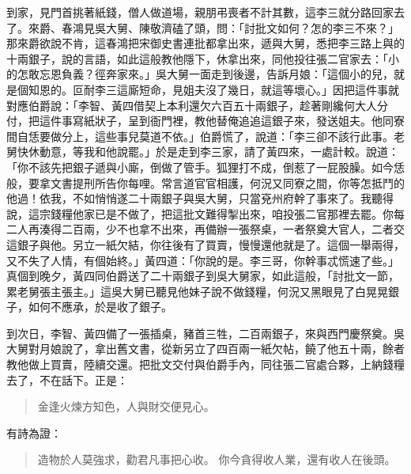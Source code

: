 到家，見門首挑著紙錢，僧人做道場，親朋弔喪者不計其數，這李三就分路回家去了。來爵、春鴻見吳大舅、陳敬濟磕了頭，問：「討批文如何？怎的李三不來？」那來爵欲說不肯，這春鴻把宋御史書連批都拿出來，遞與大舅，悉把李三路上與的十兩銀子，說的言語，如此這般教他隱下，休拿出來，同他投往張二官家去：「小的怎敢忘恩負義？徑奔家來。」吳大舅一面走到後邊，告訴月娘：「這個小的兒，就是個知恩的。叵耐李三這廝短命，見姐夫沒了幾日，就這等壞心。」因把這件事就對應伯爵說：「李智、黃四借契上本利還欠六百五十兩銀子，趁著剛纔何大人分付，把這件事寫紙狀子，呈到衙門裡，教他替俺追追這銀子來，發送姐夫。他同寮間自恁要做分上，這些事兒莫道不依。」伯爵慌了，說道：「李三卻不該行此事。老舅快休動意，等我和他說罷。」於是走到李三家，請了黃四來，一處計較。說道：「你不該先把銀子遞與小廝，倒做了管手。狐狸打不成，倒惹了一屁股臊。如今恁般，要拿文書提刑所告你每哩。常言道官官相護，何況又同寮之間，你等怎抵鬥的他過！依我，不如悄悄遂二十兩銀子與吳大舅，只當兗州府幹了事來了。我聽得說，這宗錢糧他家已是不做了，把這批文難得掣出來，咱投張二官那裡去罷。你每二人再湊得二百兩，少不也拿不出來，再備辦一張祭桌，一者祭奠大官人，二者交這銀子與他。另立一紙欠結，你往後有了買賣，慢慢還他就是了。這個一舉兩得，又不失了人情，有個始終。」黃四道：「你說的是。李三哥，你幹事忒慌速了些。」真個到晚夕，黃四同伯爵送了二十兩銀子到吳大舅家，如此這般，「討批文一節，累老舅張主張主。」這吳大舅已聽見他妹子說不做錢糧，何況又黑眼見了白晃晃銀子，如何不應承，於是收了銀子。

到次日，李智、黃四備了一張插桌，豬首三牲，二百兩銀子，來與西門慶祭奠。吳大舅對月娘說了，拿出舊文書，從新另立了四百兩一紙欠帖，饒了他五十兩，餘者教他做上買賣，陸續交還。把批文交付與伯爵手內，同往張二官處合夥，上納錢糧去了，不在話下。正是：
\begin{quote}
金逢火煉方知色，人與財交便見心。
\end{quote}
有詩為證：
\begin{quote}
造物於人莫強求，勸君凡事把心收。
你今貪得收人業，還有收人在後頭。
\end{quote}
